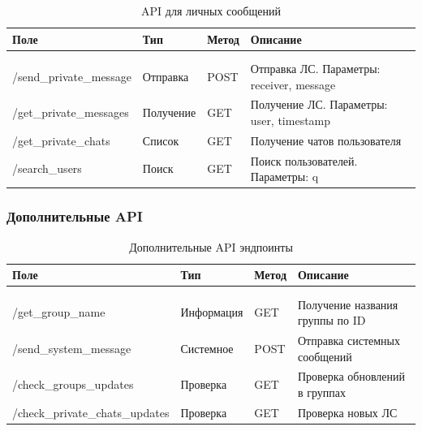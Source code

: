 \begin{xltabular}{\textwidth}{|l|l|p{1.7cm}|X|}
	\caption{API для личных сообщений}\label{tab:private_api} \\ \hline
	\centrow Поле & \centrow Тип & \centrow Метод & \centrow Описание \\ \hline
	 &  &  &  \\ \hline
	\endfirsthead
	 &  &  &  \\ \hline
	\finishhead
	/send\_private\_message & Отправка & POST & Отправка ЛС. Параметры: receiver, message \\ \hline 
	/get\_private\_messages & Получение & GET & Получение ЛС. Параметры: user, timestamp \\ \hline 
	/get\_private\_chats & Список & GET & Получение чатов пользователя \\ \hline 
	/search\_users & Поиск & GET & Поиск пользователей. Параметры: q \\ \hline 
\end{xltabular}

\subsubsection{Дополнительные API}

\begin{xltabular}{\textwidth}{|l|l|p{1.7cm}|X|}
	\caption{Дополнительные API эндпоинты}\label{tab:additional_api} \\ \hline
	\centrow Поле & \centrow Тип & \centrow Метод & \centrow Описание \\ \hline
	 &  &  &  \\ \hline
	\endfirsthead
	 &  &  &  \\ \hline
	\finishhead
	/get\_group\_name & Информация & GET & Получение названия группы по ID \\ \hline 
	/send\_system\_message & Системное & POST & Отправка системных сообщений \\ \hline 
	/check\_groups\_updates & Проверка & GET & Проверка обновлений в группах \\ \hline 
	/check\_private\_chats\_updates & Проверка & GET & Проверка новых ЛС \\ \hline 
\end{xltabular}


